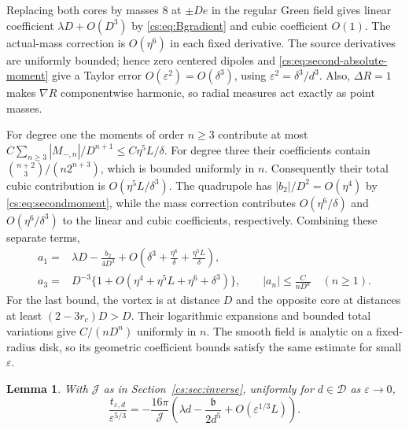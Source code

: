 \documentclass[11pt,reqno]{amsart}
\numberwithin{equation}{section}
\newtheorem{lemma}[theorem]{Lemma}
\theoremstyle{definition}
\theoremstyle{remark}
\newcommand{\eps}{\varepsilon}
\begin{document}
Replacing both cores by masses $8$ at $\pm De$ in the regular Green
field gives linear coefficient $\lambda D+O(D^3)$ by
\eqref{cs:eq:Bgradient} and cubic coefficient $O(1)$.
The actual-mass correction is $O(\eta^6)$ in each fixed derivative.
The source derivatives are uniformly bounded; hence zero centered
dipoles and \eqref{cs:eq:second-absolute-moment} give a Taylor error
$O(\eps^2)=O(\delta^3)$, using $\eps^2=\delta^3/d^3$.
Also, $\Delta R=1$ makes $\nabla R$ componentwise harmonic, so radial
measures act exactly as point masses.

For degree one the moments of order $n\ge3$ contribute at most
$C\sum_{n\ge3}|M_{-,n}|/D^{n+1}
\le C\eta^5L/\delta$.
For degree three their coefficients contain
$\binom{n+2}{3}/(n2^{n+3})$, which is bounded uniformly in $n$.
Consequently their total cubic contribution is
$O(\eta^5L/\delta^3)$.
The quadrupole has $|b_2|/D^2=O(\eta^4)$ by
\eqref{cs:eq:secondmoment}, while the mass correction contributes
$O(\eta^6/\delta)$ and $O(\eta^6/\delta^3)$ to the linear and
cubic coefficients, respectively. Combining these separate terms,
\begin{align}
 a_1={}&\lambda D-\frac{b_2}{4D^3}
       +O\left(\delta^3+\frac{\eta^6}{\delta}
                              +\frac{\eta^5L}{\delta}\right),\label{cs:eq:a1}\\
 a_3={}&D^{-3}\{1+O(\eta^4+\eta^5L+\eta^6+\delta^3)\},\qquad
 |a_n|\le \frac{C}{nD^n}\quad(n\ge1).\label{cs:eq:an}
\end{align}
For the last bound, the vortex is at distance $D$ and the opposite
core at distances at least $(2-3r_c)D>D$. Their logarithmic expansions
and bounded total variations give $C/(nD^n)$ uniformly in $n$.
The smooth field is analytic on a fixed-radius disk, so its
geometric coefficient bounds satisfy the same estimate for small $\eps$.

\begin{lemma}\label{cs:lem:reduced}
With $\mathcal J$ as in Section~\ref{cs:sec:inverse}, uniformly for
$d\in\mathcal D$ as $\eps\to0$,
\begin{equation}\label{cs:eq:reduced}
 \frac{t_{\eps,d}}{\eps^{5/3}}
   =-\frac{16\pi}{\mathcal J}
        \left(\lambda d-\frac{\mathfrak b}{2d^5}
                            +O(\eps^{1/3}L)\right).
\end{equation}
\end{lemma}
\end{document}
